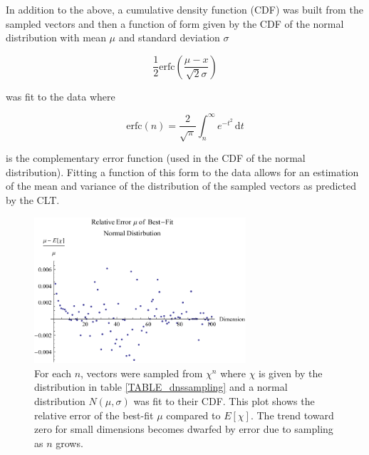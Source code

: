 \documentclass[12pt]{report}
\theoremstyle{remark}
\theoremstyle{definition}
\theoremstyle{definition}
\theoremstyle{definition}
\begin{document}
In addition to the above, a cumulative density function (CDF) was built from the
sampled vectors and then a function of form given by the CDF of the normal
distribution with mean $\mu$ and standard deviation $\sigma$

\begin{equation}
\frac{1}{2} \text{erfc}\left(\frac{\mu -x}{\sqrt{2} \sigma}\right)
\end{equation}

was fit to the data where 

\begin{equation}
\textrm{erfc}(n)=\frac{2}{\sqrt{\pi}} \int_n^{\infty}
e^{-t^2}\,\mathrm dt
\end{equation}

is the complementary error function (used in the CDF of the normal
distribution). Fitting a function of this form to the data allows for an estimation
of the mean and variance of the distribution of the sampled vectors as predicted
by the CLT.

\begin{figure}
\centering
\includegraphics[width=0.7\textwidth]{figures/dnssampling-muerror.pdf}
\caption[Relative Error of $\mu$ of Best-Fit Normal Distribution of Sampled Expected Value]
{For each $n$, vectors were sampled from $\chi^n$ where $\chi$ is given by the
distribution in table \ref{TABLE_dnssampling} and a normal distribution
$N(\mu,\sigma)$ was fit to their CDF. This plot shows the relative error of the
best-fit $\mu$ compared to $E[\chi]$. The trend toward zero for small dimensions
becomes dwarfed by error due to sampling as $n$ grows.}
\label{dnssampling-muerror}
\end{figure}
\end{document}
